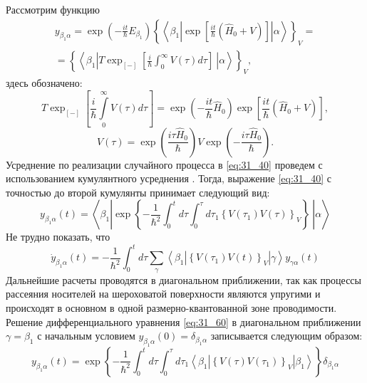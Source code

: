 Рассмотрим функцию
\begin{multline} \label{eq:31_40}
y_{{\beta }_1\alpha }=\exp\left(-\frac{it}{\hbar }E_{\beta_1}\right){\left\{\left\langle {\beta }_1\left|\exp\left[ {\frac{it}{\hbar }\left( {\hat {H}_0 + V} \right)} \right]\right|\alpha \right\rangle \right\}}_V=\\
={\left\{\left\langle {\beta }_1\left|T{{\exp}_{[-]} \left[\frac{i}{\hbar }\int^{\infty }_0{V\left(\tau \right)d \tau }\right]\ }\right|\alpha \right\rangle \right\}}_V,
\end{multline}
здесь обозначено:
\[
T{\exp_{\left[-\right]} \left[\frac{i}{\hbar }\int\limits^{\infty }_0 {V\left(\tau \right)d \tau } \right]}
	=\exp\left( {-\frac{it}{\hbar }\hat {H}_0 }\right)\exp\left[ {\frac{it}{\hbar }\left( {\hat {H}_0 + V} \right)} \right],
\] 
\[
V(\tau ) = \exp\left( {\frac{i\tau \hat {H}_0 }{\hbar }}\right)
V\exp\left( { - \frac{i\tau \hat {H}_0 }{\hbar }} \right).
\]
Усреднение по реализации случайного процесса в \eqref{eq:31_40} проведем с использованием кумулянтного усреднения \cite{Kubo1957a}. Тогда, выражение \eqref{eq:31_40} с точностью до второй кумулянты принимает следующий вид:
\[
y_{{\beta }_1\alpha }\left(t\right)=\left\langle {\beta }_1\left|{\exp \left\{-\frac{1}{{\hbar }^2}\int^t_0{d \tau \int^{\tau }_0{d {\tau }_1{\left\{V\left({\tau }_1\right)V\left(\tau \right)\right\}}_V}}\right\}\ }\right|\alpha \right\rangle
\]
Не трудно показать, что
\begin{equation} \label{eq:31_60}
{\dot{y}}_{{\beta }_1\alpha }\left(t\right)=-\frac{1}{{\hbar }^2}\int^t_0{d \tau \sum_{\gamma }{\left\langle {\beta }_1\left|{\left\{V\left({\tau }_1\right)V\left(t\right)\right\}}_V\right|\gamma \right\rangle y_{\gamma \alpha }\left(t\right)}}
\end{equation} 
Дальнейшие расчеты проводятся в диагональном приближении, так как процессы рассеяния носителей на шероховатой поверхности являются упругими и происходят в основном в одной размерно-квантованной зоне проводимости. Решение дифференциального уравнения \eqref{eq:31_60} в диагональном приближении $\gamma ={\beta }_1$ с начальным условием $y_{{\beta }_1\alpha }\left(0\right)={\delta }_{{\beta }_1\alpha }$ записывается следующим образом:
\begin{equation} \label{eq:31_70}
y_{{\beta }_1\alpha }\left(t\right)=\exp \left\{-\frac{1}{{\hbar }^2}\int^t_0{d \tau \int^{\tau }_0{d {\tau }_1\left\langle {\beta }_1\left|{\left\{V\left(\tau \right)V\left({\tau }_1\right)\right\}}_V\right|{\beta }_1\right\rangle }}\right\}{\delta }_{{\beta }_1\alpha }
\end{equation} 

